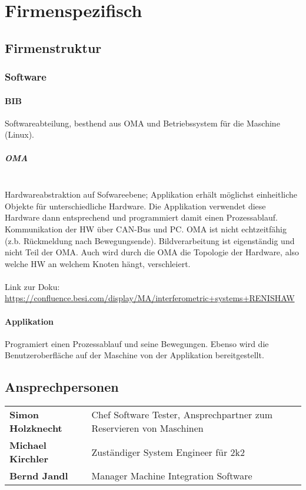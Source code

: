 \section{Firmenspezifisch}
	\subsection{Firmenstruktur}
		\subsubsection{Software}
			\paragraph{BIB}
				Softwareabteilung, besthend aus OMA und Betriebssystem für die Maschine (Linux).
				\subparagraph{OMA}\leavevmode\\
					Hardwareabstraktion auf Sofwareebene; Applikation erhält möglichst einheitliche Objekte für unterschiedliche Hardware. Die Applikation verwendet diese Hardware dann entsprechend und programmiert damit einen Prozessablauf. Kommunikation der HW über CAN-Bus und PC. OMA ist nicht echtzeitfähig (z.b. Rückmeldung nach Bewegungsende). Bildverarbeitung ist eigenständig und nicht Teil der OMA. Auch wird durch die OMA die Topologie der Hardware, also welche HW an welchem Knoten hängt, verschleiert. \\\\
					Link zur Doku: \hyperlink{dsf}{https://confluence.besi.com/display/MA/interferometric+systems+RENISHAW}
			\paragraph{Applikation}
				Programiert einen Prozessablauf und seine Bewegungen. Ebenso wird die Benutzeroberfläche auf der Maschine von der Applikation bereitgestellt.
	\subsection{Ansprechpersonen}
		\begin{tabular}{l|p{14cm}}
			\rowcolor{gray!10!white}
			\textbf{Simon Holzknecht} & Chef Software Tester, Ansprechpartner zum Reservieren von Maschinen \\
			\rowcolor{gray!00!white}
			\textbf{Michael Kirchler} & Zuständiger System Engineer für 2k2 \\
			\rowcolor{gray!10!white}
			\textbf{Bernd Jandl} & Manager Machine Integration Software\\
			
		\end{tabular}